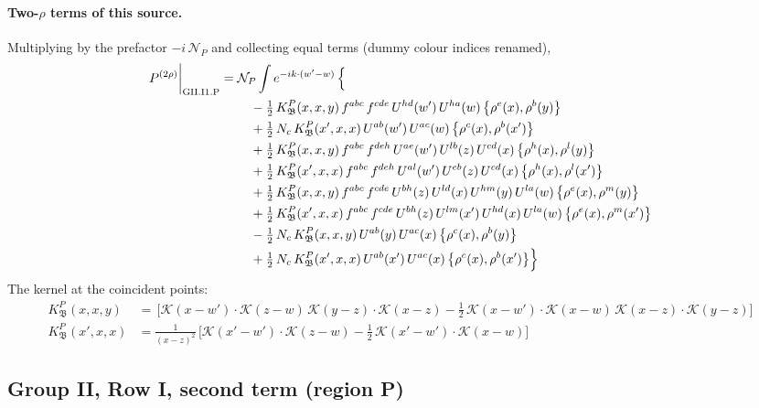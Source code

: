 \documentclass[10pt]{article}
\numberwithin{equation}{section}
\newcommand{\KK}{\mathcal K}
\newcommand{\NP}{\mathcal N_{P}}
\begin{document}
\paragraph{Two-$\rho$ terms of this source.} Multiplying by the prefactor $-i\,\NP$ and collecting equal terms (dummy colour indices renamed),
\begin{align}
P^{(2\rho)}\bigg|_{\rm GII.I1.P}={}&\NP\int e^{-ik\cdot(w'-w)}\,\Big\{\notag\\
&\quad -\tfrac12\,K^{P}_{\mathfrak B}(x,x,y)\,f^{abc}\,f^{cde}\,U^{hd}(w')\,U^{ha}(w)\,\big\{\rho^{e}(x),\rho^{b}(y)\big\}\notag\\
&\quad +\tfrac12\,N_{c}\,K^{P}_{\mathfrak B}(x',x,x)\,U^{ab}(w')\,U^{ac}(w)\,\big\{\rho^{c}(x),\rho^{b}(x')\big\}\notag\\
&\quad +\tfrac12\,K^{P}_{\mathfrak B}(x,x,y)\,f^{abc}\,f^{deh}\,U^{ae}(w')\,U^{lb}(z)\,U^{cd}(x)\,\big\{\rho^{h}(x),\rho^{l}(y)\big\}\notag\\
&\quad +\tfrac12\,K^{P}_{\mathfrak B}(x',x,x)\,f^{abc}\,f^{deh}\,U^{al}(w')\,U^{eb}(z)\,U^{cd}(x)\,\big\{\rho^{h}(x),\rho^{l}(x')\big\}\notag\\
&\quad +\tfrac12\,K^{P}_{\mathfrak B}(x,x,y)\,f^{abc}\,f^{cde}\,U^{bh}(z)\,U^{ld}(x)\,U^{hm}(y)\,U^{la}(w)\,\big\{\rho^{e}(x),\rho^{m}(y)\big\}\notag\\
&\quad +\tfrac12\,K^{P}_{\mathfrak B}(x',x,x)\,f^{abc}\,f^{cde}\,U^{bh}(z)\,U^{lm}(x')\,U^{hd}(x)\,U^{la}(w)\,\big\{\rho^{e}(x),\rho^{m}(x')\big\}\notag\\
&\quad -\tfrac12\,N_{c}\,K^{P}_{\mathfrak B}(x,x,y)\,U^{ab}(y)\,U^{ac}(x)\,\big\{\rho^{c}(x),\rho^{b}(y)\big\}\notag\\
&\quad +\tfrac12\,N_{c}\,K^{P}_{\mathfrak B}(x',x,x)\,U^{ab}(x')\,U^{ac}(x)\,\big\{\rho^{c}(x),\rho^{b}(x')\big\}\Big\}\label{eq:res-GII.I1.P}
\end{align}
The kernel at the coincident points:
\begin{align*}
K^{P}_{\mathfrak B}(x,x,y)&=\,\Big[\KK(x-w')\cdot\KK(z-w)\,\KK(y-z)\cdot\KK(x-z)-\frac{1}{2}\,\KK(x-w')\cdot\KK(x-w)\,\KK(x-z)\cdot\KK(y-z)\Big]\\K^{P}_{\mathfrak B}(x',x,x)&=\frac{1}{(x-z)^2}\,\Big[\KK(x'-w')\cdot\KK(z-w)-\frac{1}{2}\,\KK(x'-w')\cdot\KK(x-w)\Big]
\end{align*}
\subsection{Group II, Row I, second term (region P)}\label{sec:GII.I2.P}
\end{document}
